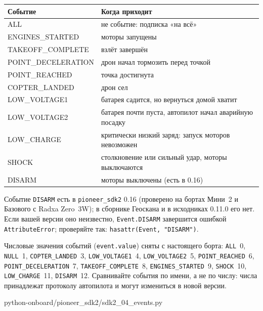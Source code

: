 \begin{center}
\small
\begin{tabularx}{\linewidth}{@{}>{\ttfamily}l X@{}}
\toprule
\textrm{\textbf{Событие}} & \textbf{Когда приходит} \\
\midrule
ALL & не событие: подписка «на всё» \\
ENGINES\_STARTED & моторы запущены \\
TAKEOFF\_COMPLETE & взлёт завершён \\
POINT\_DECELERATION & дрон начал тормозить перед точкой \\
POINT\_REACHED & точка достигнута \\
COPTER\_LANDED & дрон сел \\
LOW\_VOLTAGE1 & батарея садится, но вернуться домой хватит \\
LOW\_VOLTAGE2 & батарея почти пуста, автопилот начал аварийную посадку \\
LOW\_CHARGE & критически низкий заряд: запуск моторов невозможен \\
SHOCK & столкновение или сильный удар, моторы выключаются \\
DISARM & моторы выключены (есть в 0.16) \\
\bottomrule
\end{tabularx}
\end{center}

\begin{infobox}
Событие \verb|DISARM| есть в \texttt{pioneer\_sdk2} 0.16 (проверено на бортах Мини~2 и Базового с Radxa Zero~3W); в сборнике Геоскана и в исходниках 0.11.0 его нет. Если вашей версии оно неизвестно, \verb|Event.DISARM| завершится ошибкой \verb|AttributeError|; проверяйте так: \verb|hasattr(Event, "DISARM")|.

Числовые значения событий (\verb|event.value|) сняты с настоящего борта: \texttt{ALL}~0, \texttt{NULL}~1, \texttt{COPTER\_LANDED}~3, \texttt{LOW\_VOLTAGE1}~4, \texttt{LOW\_VOLTAGE2}~5, \texttt{POINT\_REACHED}~6, \texttt{POINT\_DECELERATION}~7, \texttt{TAKEOFF\_COMPLETE}~8, \texttt{ENGINES\_STARTED}~9, \texttt{SHOCK}~10, \texttt{LOW\_CHARGE}~11, \texttt{DISARM}~12. Сравнивайте события по имени, а не по числу: числа принадлежат протоколу автопилота и могут измениться в новой версии.
\end{infobox}

\begin{codefile}[python]{python-onboard/pioneer_sdk2/sdk2_04_events.py}
\end{codefile}

